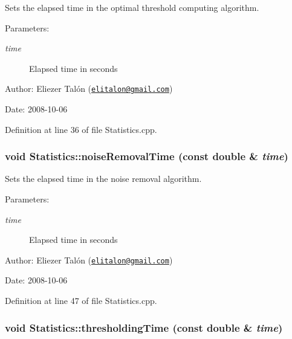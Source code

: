 Sets the elapsed time in the optimal threshold computing algorithm. 

\begin{Desc}
\item[Parameters:]
\begin{description}
\item[{\em time}]Elapsed time in seconds\end{description}
\end{Desc}
\begin{Desc}
\item[Author:]Eliezer Talón (\href{mailto:elitalon@gmail.com}{\tt elitalon@gmail.com}) \end{Desc}
\begin{Desc}
\item[Date:]2008-10-06 \end{Desc}


Definition at line 36 of file Statistics.cpp.\hypertarget{class_statistics_4ad24aec4e5491b7d3afca143e6deb05}{
\subsubsection[noiseRemovalTime]{\setlength{\rightskip}{0pt plus 5cm}void Statistics::noiseRemovalTime (const double \& {\em time})}}
\label{class_statistics_4ad24aec4e5491b7d3afca143e6deb05}


Sets the elapsed time in the noise removal algorithm. 

\begin{Desc}
\item[Parameters:]
\begin{description}
\item[{\em time}]Elapsed time in seconds\end{description}
\end{Desc}
\begin{Desc}
\item[Author:]Eliezer Talón (\href{mailto:elitalon@gmail.com}{\tt elitalon@gmail.com}) \end{Desc}
\begin{Desc}
\item[Date:]2008-10-06 \end{Desc}


Definition at line 47 of file Statistics.cpp.\hypertarget{class_statistics_ca6e07bda50783e324e8c51d8c815019}{
\subsubsection[thresholdingTime]{\setlength{\rightskip}{0pt plus 5cm}void Statistics::thresholdingTime (const double \& {\em time})}}
\label{class_statistics_ca6e07bda50783e324e8c51d8c815019}


